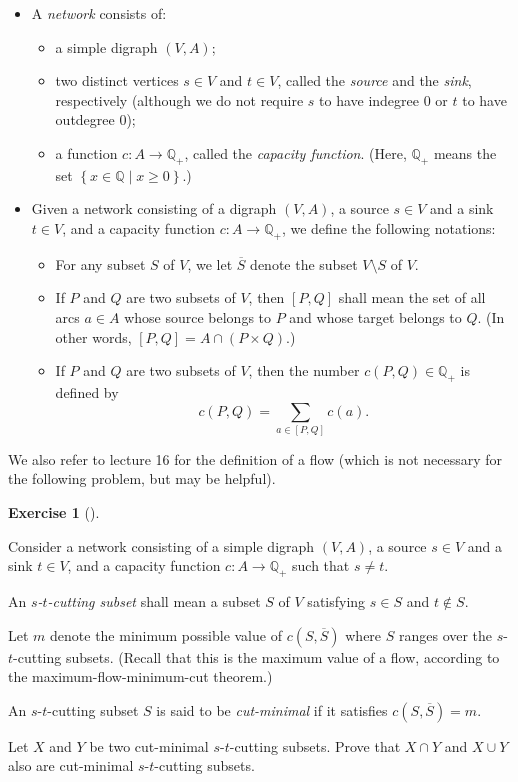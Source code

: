 \documentclass[numbers=enddot,12pt,final,onecolumn,notitlepage]{scrartcl}%
\newcounter{exer}
\theoremstyle{definition}
\newtheorem{exmp}[exer]{Exercise}
\newenvironment{exercise}[1][]
{\begin{exmp}[#1]\begin{leftbar}}
{\end{leftbar}\end{exmp}}
\let\sumnonlimits\sum
\renewcommand{\sum}{\sumnonlimits\limits}
\newcommand{\QQ}{\mathbb{Q}}
\newcommand{\set}[1]{\left\{ #1 \right\}}
\newcommand{\tup}[1]{\left( #1 \right)}
\newcommand{\ive}[1]{\left[ #1 \right]}
\begin{document}
\begin{itemize}
\item A \textit{network} consists of:
      \begin{itemize}
      \item a simple digraph $\tup{V, A}$;
      \item two distinct vertices $s \in V$ and $t \in V$,
            called the \textit{source} and the \textit{sink},
            respectively (although we do not require $s$ to
            have indegree $0$ or $t$ to have outdegree $0$);
      \item a function $c : A \to \QQ_+$, called the
            \textit{capacity function}.
            (Here, $\QQ_+$ means the set
            $\set{ x \in \QQ \mid x \geq 0 }$.)
      \end{itemize}

\item Given a network consisting of a digraph
      $\tup{V, A}$, a source $s \in V$ and a sink $t \in V$,
      and a capacity function $c : A \to \QQ_+$, we define
      the following notations:
      \begin{itemize}
      \item For any subset $S$ of $V$, we let $\overline{S}$
            denote the subset $V \setminus S$ of $V$.
      \item If $P$ and $Q$ are two subsets of $V$, then
            $\ive{P, Q}$ shall mean the set of all arcs
            $a \in A$ whose source belongs to $P$ and whose
            target belongs to $Q$.
            (In other words,
            $\ive{P, Q} = A \cap \tup{P \times Q}$.)
      \item If $P$ and $Q$ are two subsets of $V$, then the
            number $c \tup{P, Q} \in \QQ_+$ is defined by
            \[
            c \tup{P, Q} = \sum_{a \in \ive{P, Q}} c \tup{a} .
            \]
      \end{itemize}
\end{itemize}

We also refer to lecture 16 \cite{lec16} for the definition of a flow
(which is not necessary for the following problem, but may
be helpful).

\begin{exercise} \label{exe.flows-cuts.cut-lattice}
Consider a network consisting of a simple digraph
$\tup{V, A}$, a source $s \in V$ and a sink $t \in V$,
and a capacity function $c : A \to \QQ_+$
such that $s \neq t$.

An \textit{$s$-$t$-cutting subset} shall mean a subset
$S$ of $V$ satisfying $s \in S$ and $t \notin S$.

Let $m$ denote the minimum possible value of
$c \tup{S, \overline{S}}$ where $S$ ranges over the
$s$-$t$-cutting subsets.
(Recall that this is the maximum value of a
flow, according to the
maximum-flow-minimum-cut theorem.)

An $s$-$t$-cutting subset $S$ is said to be
\textit{cut-minimal} if it satisfies
$c \tup{S, \overline{S}} = m$.

Let $X$ and $Y$ be two cut-minimal $s$-$t$-cutting subsets.
Prove that $X \cap Y$ and $X \cup Y$ also are
cut-minimal $s$-$t$-cutting subsets.
\end{exercise}
\end{document}
